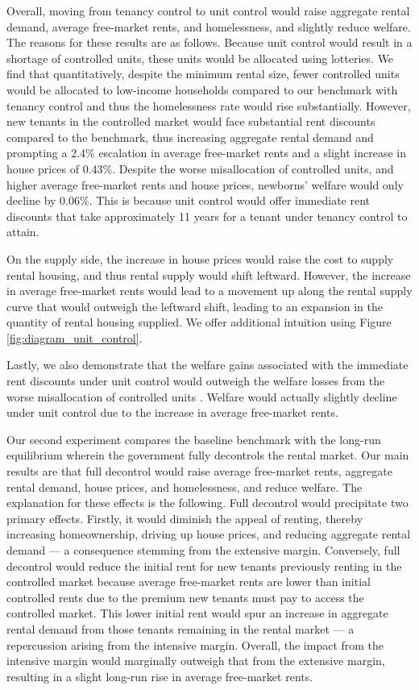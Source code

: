 \documentclass[parskip=full]{article}
\begin{document}
Overall, moving from tenancy control to unit control would raise aggregate rental demand, average free-market rents, and homelessness, and slightly reduce welfare. The reasons for these results are as follows. Because unit control would result in a shortage of controlled units, these units would be allocated using lotteries. We find that quantitatively, despite the minimum rental size, fewer controlled units would be allocated to low-income households compared to our benchmark with tenancy control and thus the homelessness rate would rise substantially. However, new tenants in the controlled market would face substantial rent discounts compared to the benchmark, thus increasing aggregate rental demand and prompting a 2.4\% escalation in average free-market rents and a slight increase in house prices of 0.43\%. Despite the worse misallocation of controlled units, and higher average free-market rents and house prices, newborns' welfare would only decline by 0.06\%. This is because unit control would offer immediate rent discounts that take approximately 11 years for a tenant under tenancy control to attain. 

On the supply side, the increase in house prices would raise the cost to supply rental housing, and thus rental supply would shift leftward. However, the increase in average free-market rents would lead to a movement up along the rental supply curve that would outweigh the leftward shift, leading to an expansion in the quantity of rental housing supplied. We offer additional intuition using Figure \ref{fig:diagram_unit_control}.

Lastly, we also demonstrate that the welfare gains associated with the immediate rent discounts under unit control would outweigh the welfare losses from the worse misallocation of controlled units \citep{gl-2003}. Welfare would actually slightly decline under unit control due to the increase in average free-market rents.

Our second experiment compares the baseline benchmark with the long-run equilibrium wherein the government fully decontrols the rental market. Our main results are that full decontrol would raise average free-market rents, aggregate rental demand, house prices, and homelessness, and reduce welfare. The explanation for these effects is the following. Full decontrol would precipitate two primary effects. Firstly, it would diminish the appeal of renting, thereby increasing homeownership, driving up house prices, and reducing aggregate rental demand --- a consequence stemming from the extensive margin. Conversely, full decontrol would reduce the initial rent for new tenants previously renting in the controlled market because average free-market rents are lower than initial controlled rents due to the premium new tenants must pay to access the controlled market. This lower initial rent would spur an increase in aggregate rental demand from those tenants remaining in the rental market --- a repercussion arising from the intensive margin. Overall, the impact from the intensive margin would marginally outweigh that from the extensive margin, resulting in a slight long-run rise in average free-market rents. 
\end{document}
